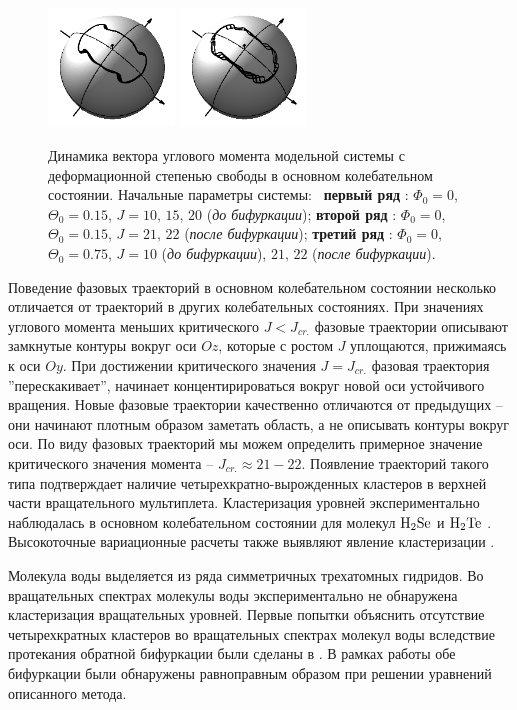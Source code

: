 \begin{figure}[H]
	\includegraphics[width=0.3\textwidth]{../pictures/rigid_base/plot_J=21n=0theta=75.png}
	\includegraphics[width=0.3\textwidth]{../pictures/rigid_base/plot_J=22n=0theta=75.png}
	\caption{Динамика вектора углового момента модельной системы с деформационной степенью свободы в основном колебательном состоянии. Начальные параметры системы: \
	\textbf{первый ряд} : $\Phi_0 = 0$, $\Theta_0 = 0.15$, $J = 10, \, 15, \, 20$ (\textit{до бифуркации});
	\textbf{второй ряд} : $\Phi_0 = 0$, $\Theta_0 = 0.15$, $J = 21, \, 22$ (\textit{после бифуркации});
	\textbf{третий ряд} : $\Phi_0 = 0$, $\Theta_0 = 0.75$, $J = 10$ (\textit{до бифуркации}), $21, \, 22$ (\textit{после бифуркации}).}
	\label{fig:rigid_base1}
\end{figure}

Поведение фазовых траекторий в основном колебательном состоянии несколько отличается от траекторий в других колебательных состояниях. При значениях углового момента меньших критического $J < J_{cr.}$ фазовые траектории описывают замкнутые контуры вокруг оси $Oz$, которые с ростом $J$ уплощаются, прижимаясь к оси $Oy$. При достижении критического значения $J = J_{cr.}$ фазовая траектория ''перескакивает'', начинает концентирироваться вокруг новой оси устойчивого вращения. Новые фазовые траектории качественно отличаются от предыдущих -- они начинают плотным образом заметать область, а не описывать контуры вокруг оси. По виду фазовых траекторий мы можем определить примерное значение критического значения момента -- $J_{cr.} \approx 21-22$. Появление траекторий такого типа подтверждает наличие четырехкратно-вырожденных кластеров в верхней части вращательного мультиплета. Кластеризация уровней экспериментально наблюдалась в основном колебательном состоянии для молекул $\ce{H2Se}$ \cite{kozin1993} и $\ce{H2Te}$ \cite{kozin1996}. Высокоточные вариационные расчеты также выявляют явление кластеризации \cite{jensen1997}. \par
Молекула воды выделяется из ряда симметричных трехатомных гидридов. Во вращательных спектрах молекулы воды экспериментально не обнаружена кластеризация вращательных уровней. Первые попытки объяснить отсутствие четырехкратных кластеров во вращательных спектрах молекул воды вследствие протекания обратной бифуркации были сделаны в \cite{koz1996, koz1997}. В рамках работы \cite{petrov2002} обе бифуркации были обнаружены равноправным образом при решении уравнений описанного метода. 

